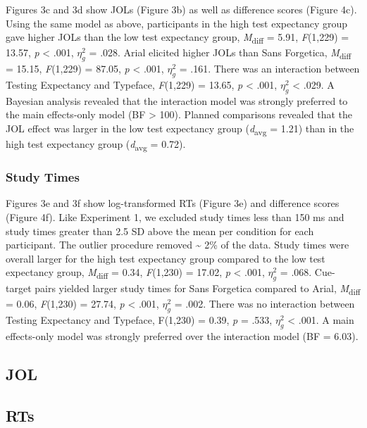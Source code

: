 \documentclass[
  english,
  jou]{apa7}
\begin{document}
Figures 3c and 3d show JOLs (Figure 3b) as well as difference scores (Figure 4c). Using the same model as above, participants in the high test expectancy group gave higher JOLs than the low test expectancy group, \emph{M}\textsubscript{diff} = 5.91, \emph{F}(1,229) = 13.57, \emph{p} \textless{} .001, \(\eta_{g}^{2}\) = .028. Arial elicited higher JOLs than Sans Forgetica, \emph{M}\textsubscript{diff} = 15.15, \emph{F}(1,229) = 87.05, \emph{p} \textless{} .001, \(\eta_{g}^{2}\) = .161. There was an interaction between Testing Expectancy and Typeface, \emph{F}(1,229) = 13.65, \emph{p} \textless{} .001, \(\eta_{g}^{2}\) \textless{} .029. A Bayesian analysis revealed that the interaction model was strongly preferred to the main effects-only model (BF \textgreater{} 100). Planned comparisons revealed that the JOL effect was larger in the low test expectancy group (\emph{d}\textsubscript{avg} = 1.21) than in the high test expectancy group (\emph{d}\textsubscript{avg} = 0.72).

\hypertarget{study-times-1}{%
\subsubsection{Study Times}\label{study-times-1}}

Figures 3e and 3f show log-transformed RTs (Figure 3e) and difference scores (Figure 4f). Like Experiment 1, we excluded study times less than 150 ms and study times greater than 2.5 SD above the mean per condition for each participant. The outlier procedure removed \textasciitilde{} 2\% of the data. Study times were overall larger for the high test expectancy group compared to the low test expectancy group, \emph{M}\textsubscript{diff} = 0.34, \emph{F}(1,230) = 17.02, \emph{p} \textless{} .001, \(\eta_{g}^{2}\) = .068. Cue-target pairs yielded larger study times for Sans Forgetica compared to Arial, \emph{M}\textsubscript{diff} = 0.06, \emph{F}(1,230) = 27.74, \emph{p} \textless{} .001, \(\eta_{g}^{2}\) = .002. There was no interaction between Testing Expectancy and Typeface, F(1,230) = 0.39, \emph{p} = .533, \(\eta_{g}^{2}\) \textless{} .001. A main effects-only model was strongly preferred over the interaction model (BF = 6.03).

\hypertarget{jol}{%
\subsection{JOL}\label{jol}}

\hypertarget{rts}{%
\subsection{RTs}\label{rts}}
\end{document}
